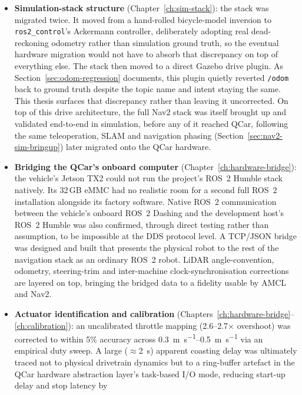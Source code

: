 \begin{itemize}
  \item \textbf{Simulation-stack structure} (Chapter~\ref{ch:sim-stack}):
    the stack was migrated twice. It moved from a hand-rolled
    bicycle-model inversion to \texttt{ros2\_control}'s Ackermann
    controller, deliberately adopting real dead-reckoning odometry
    rather than simulation ground truth, so the eventual hardware
    migration would not have to absorb that discrepancy on top of
    everything else. The stack then moved to a direct Gazebo drive
    plugin.
    As Section~\ref{sec:odom-regression} documents, this plugin
    quietly reverted \texttt{/odom} back to ground truth despite the
    topic name and intent staying the same. This thesis surfaces
    that discrepancy rather than leaving it uncorrected. On top of
    this drive architecture, the full Nav2 stack was itself brought
    up and validated end-to-end in simulation, before any of it
    reached QCar, following the same teleoperation, SLAM and
    navigation phasing (Section~\ref{sec:nav2-sim-bringup}) later
    migrated onto the QCar hardware.
  \item \textbf{Bridging the QCar's onboard computer}
    (Chapter~\ref{ch:hardware-bridge}): the vehicle's Jetson TX2 could
    not run the project's ROS~2 Humble stack natively. Its 32\,GB
    eMMC had no realistic room for a second full ROS~2 installation
    alongside its factory software. Native ROS~2 communication
    between the vehicle's onboard ROS~2 Dashing and the development
    host's ROS~2 Humble was also confirmed, through direct testing
    rather than assumption, to be impossible at the DDS protocol
    level. A TCP/JSON bridge was designed and built that
    presents the physical robot to the rest of the navigation stack
    as an ordinary ROS~2 robot. LiDAR angle-convention, odometry,
    steering-trim and inter-machine clock-synchronisation corrections
    are layered on top, bringing the bridged data to a fidelity usable
    by AMCL and Nav2.
  \item \textbf{Actuator identification and calibration}
    (Chapters~\ref{ch:hardware-bridge}--\ref{ch:calibration}): an
    uncalibrated throttle mapping (2.6--2.7$\times$ overshoot) was
    corrected to within 5\% accuracy across
    \SIrange{0.3}{0.5}{\meter\per\second} via an empirical duty sweep.
    A large ($\approx$\SI{2}{\second}) apparent coasting delay was
    ultimately traced not to physical drivetrain dynamics but to a
    ring-buffer artefact in the QCar hardware abstraction layer's
    task-based I/O mode, reducing start-up delay and stop latency by

\end{itemize}
